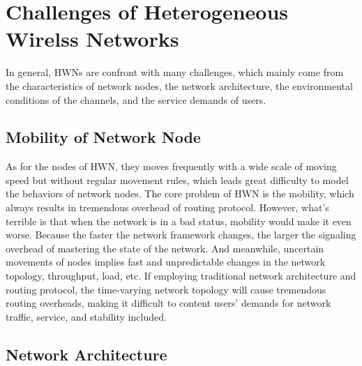 \documentclass[journal,comsoc]{IEEEtran}
\begin{document}
	\section{Challenges of Heterogeneous Wirelss Networks}
	\label{section: research_challenges}
	In general, HWNs are confront with many challenges, 
	which mainly come from the characteristics of network nodes, the network architecture, 
	the environmental conditions of the channels, and the service demands of users.
	
	\subsection{Mobility of Network Node}
	As for the nodes of HWN,  they moves frequently with a wide scale of moving speed but without regular movement rules, 
	which leads great difficulty to model the behaviors of network nodes.
	The core problem of HWN is the mobility, which always results in tremendous overhead of routing protocol. 
	However, what's terrible is that when the network is in a bad status, mobility would make it even worse. 
	Because the faster the network framework changes, the larger the signaling overhead of mastering the state of the network.
	And meanwhile, uncertain movements of nodes implies fast and unpredictable changes in the network topology, throughput, load, etc. 
	If employing traditional network architecture and routing protocol, the time-varying network topology will cause tremendous routing overheads, 
	making it difficult to content users' demands for network traffic, service, and stability included.
	
	\subsection{Network Architecture}
	
\end{document}
